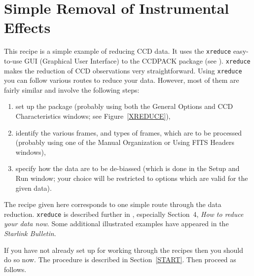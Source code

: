 \documentclass[twoside,11pt]{starlink}
\begin{document}
\newpage
\section{\label{SIMPLE_SOLUTION}Simple Removal of
Instrumental Effects}

This recipe is a simple example of reducing CCD data.  It uses the
\texttt{xreduce} easy-to-use GUI (Graphical User Interface) to the CCDPACK
package (see \/\cite{SUN139}).  \texttt{xreduce}
makes the reduction of CCD observations very straightforward.  Using
\texttt{xreduce} you can follow various routes to reduce your data.  However,
most of them are fairly similar and involve the following steps:

\begin{enumerate}

  \item set up the package (probably using both the \textsf{General Options}
   and \textsf{CCD Characteristics} windows; see Figure~\ref{XREDUCE}),

  \item identify the various frames, and types of frames, which are to
   be processed (probably using one of the \textsf{Manual Organization} or
   \textsf{Using FITS Headers} windows),

  \item specify how the data are to be de-biassed (which is done in the
   \textsf{Setup and Run} window; your choice will be restricted to options
   which are valid for the given data).

\end{enumerate}

The recipe given here corresponds to one simple route through the data
reduction.
\texttt{xreduce} is described further in , especially
Section~4, \textit{How to reduce your data now}.  Some additional illustrated
examples have appeared in the \textit{Starlink Bulletin}\/\cite{DRAPER95}.

If you have not already set up for working through the recipes then
you should do so now.  The procedure is described in Section~\ref{START}.
Then proceed as follows.
\end{document}
